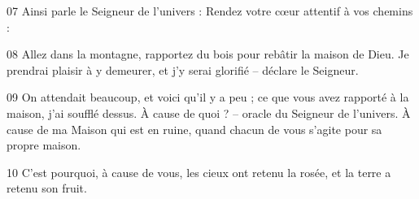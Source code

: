 
07 Ainsi parle le Seigneur de l’univers : Rendez votre cœur attentif à vos chemins :

08 Allez dans la montagne, rapportez du bois pour rebâtir la maison de Dieu. Je prendrai plaisir à y demeurer, et j’y serai glorifié – déclare le Seigneur.

09 On attendait beaucoup, et voici qu’il y a peu ; ce que vous avez rapporté à la maison, j’ai soufflé dessus. À cause de quoi ? – oracle du Seigneur de l’univers. À cause de ma Maison qui est en ruine, quand chacun de vous s’agite pour sa propre maison.

10 C’est pourquoi, à cause de vous, les cieux ont retenu la rosée, et la terre a retenu son fruit.